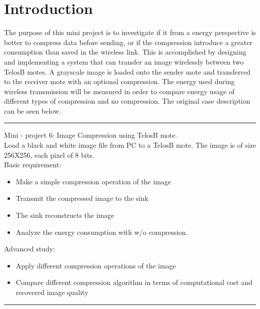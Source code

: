 \section{Introduction}
The purpose of this mini project is to investigate if it from a energy perspective is better to compress data before sending, or if the compression introduce a greater consumption than saved in the wireless link. 
This is accomplished by designing and implementing a system that can transfer an image wirelessly between two TelosB motes. 
A grayscale image is loaded onto the sender mote and transferred to the receiver mote with an optional compression. 
The energy used during wireless transmission will be measured in order to compare energy usage of different types of compression and no compression. 
The original case description can be seen below.

\begin{center}
\noindent\rule{4cm}{0.4pt}
\end{center}
Mini - project 6: Image Compression using TelosB mote.\\
Load a black and white image file from PC to a TelosB mote. 
The image is of size 256X256, each pixel of 8 bits.\\
Basic requirement:
\begin{itemize}
\item Make a simple compression operation of the image
\item Transmit the compressed image to the sink
\item The sink reconstructs the image
\item Analyze the energy consumption with w/o compression. 
\end{itemize}
Advanced study:
\begin{itemize}
\item Apply different compression operations of the image
\item Compare different compression algorithm in terms of computational cost and recovered image quality
\end{itemize}
\begin{center}
\noindent\rule{4cm}{0.4pt}
\end{center}

